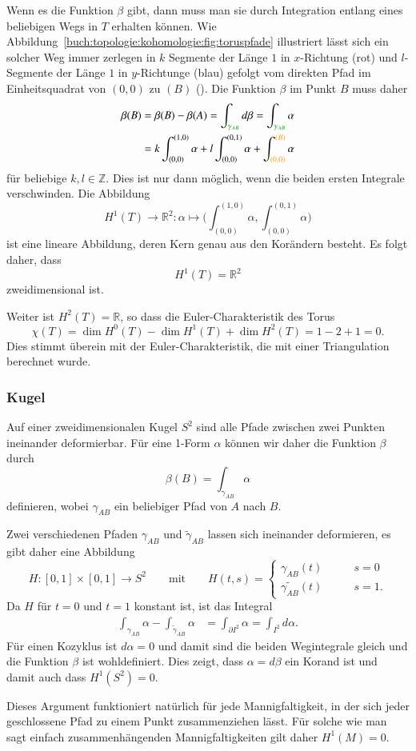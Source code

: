 Wenn es die Funktion $\beta$ gibt, dann muss man sie durch Integration
entlang eines beliebigen Wegs in $T$ erhalten können.
Wie Abbildung~\ref{buch:topologie:kohomologie:fig:toruspfade}
illustriert lässt sich ein solcher Weg immer zerlegen in 
$k$ Segmente der Länge $1$ in $x$-Richtung ({\color{darkred}rot})
und $l$-Segmente der Länge $1$ in $y$-Richtunge ({\color{blue}blau})
gefolgt vom direkten Pfad im Einheitsquadrat von $(0,0)$ zu $(B)$
({\color{orange}}).
Die Funktion $\beta$ im Punkt $B$ muss daher
\begin{align*}
\beta(B)
&=
\beta(B) - \beta(A)
=
\int_{{\color{darkgreen}\gamma_{AB}}} d\beta
=
\int_{{\color{darkgreen}\gamma_{AB}}} \alpha
\\
&=
k\int_{(0,0)}^{(1,0)}\alpha
+
l\int_{(0,0)}^{(0,1)}\alpha
+
\int_{(0,0)}^{\color{orange}(B)}\alpha
\end{align*}
für beliebige $k,l\in\mathbb{Z}$.
Dies ist nur dann möglich, wenn die beiden ersten Integrale verschwinden.
Die Abbildung
\[
H^1(T)
\to
\mathbb{R}^2
:
\alpha
\mapsto
\biggl(
\int_{(0,0)}^{(1,0)}
\alpha,
\int_{(0,0)}^{(0,1)}
\alpha
\biggr)
\]
ist eine lineare Abbildung, deren Kern genau aus den Korändern besteht.
Es folgt daher, dass
\[
H^1(T) = \mathbb{R}^2
\]
zweidimensional ist.

Weiter ist $H^2(T)=\mathbb{R}$, so dass die Euler-Charakteristik des Torus
\[
\chi(T)
=
\dim H^0(T) - \dim H^1(T) + \dim H^2(T)
=
1-2+1
=
0.
\]
Dies stimmt überein mit der Euler-Charakteristik, die mit einer Triangulation
berechnet wurde.

%
%
\subsubsection{Kugel}
Auf einer zweidimensionalen Kugel $S^2$ sind alle Pfade zwischen zwei
Punkten ineinander deformierbar.
Für eine 1-Form $\alpha$ können wir daher die Funktion $\beta$ durch
\[
\beta(B)
=
\int_{\gamma_{AB}} \alpha
\]
definieren, wobei $\gamma_{AB}$ ein beliebiger Pfad von $A$ nach $B$.

Zwei verschiedenen Pfaden $\gamma_{AB}$ und $\tilde{\gamma}_{AB}$
lassen sich ineinander deformieren, es gibt daher eine Abbildung
\[
H
\colon
[0,1]\times[0,1] \to S^2
\qquad\text{mit}\qquad
H(t,s)
=
\begin{cases}
\gamma_{AB}(t)          &\qquad s=0\\
\tilde{\gamma_{AB}} (t) &\qquad s=1.
\end{cases}
\]
Da $H$ für $t=0$ und $t=1$ konstant ist, ist das Integral 
\begin{align*}
\int_{\gamma_{AB}} \alpha
-
\int_{\tilde{\gamma}_{AB}} \alpha
&=
\int_{\partial I^2} \alpha
=
\int_{I^2} d\alpha.
\end{align*}
Für einen Kozyklus ist $d\alpha=0$ und damit sind die beiden Wegintegrale
gleich und die Funktion $\beta$ ist wohldefiniert.
Dies zeigt, dass $\alpha=d\beta$ ein Korand ist und damit auch dass
$H^1(S^2)=0$.

Dieses Argument funktioniert natürlich für jede Mannigfaltigkeit,
in der sich jeder geschlossene Pfad zu einem Punkt zusammenziehen
lässt.
Für solche wie man sagt einfach zusammenhängenden Mannigfaltigkeiten
gilt daher $H^1(M)=0$.



